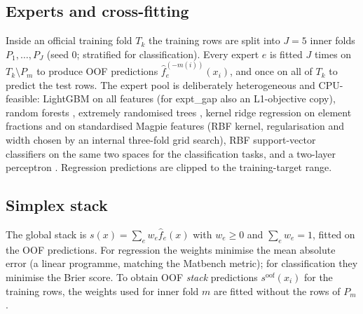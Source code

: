 \subsection{Experts and cross-fitting}
Inside an official training fold $T_k$ the training rows are split into $J=5$ inner folds $P_1,\dots,P_J$ (seed 0; stratified for classification).
Every expert $e$ is fitted $J$ times on $T_k\setminus P_m$ to produce OOF predictions $\hat f_e^{(-m(i))}(x_i)$, and once on all of $T_k$ to predict the test rows.
The expert pool is deliberately heterogeneous and CPU-feasible: LightGBM \citep{ke2017lightgbm} on all features (for expt\_gap also an L1-objective copy), random forests \citep{breiman2001rf}, extremely randomised trees \citep{geurts2006et}, kernel ridge regression on element fractions and on standardised Magpie features (RBF kernel, regularisation and width chosen by an internal three-fold grid search), RBF support-vector classifiers on the same two spaces for the classification tasks, and a two-layer perceptron \citep{pedregosa2011sklearn}.
Regression predictions are clipped to the training-target range.

\subsection{Simplex stack}
The global stack is $s(x)=\sum_e w_e \hat f_e(x)$ with $w_e\ge 0$ and $\sum_e w_e=1$, fitted on the OOF predictions.
For regression the weights minimise the mean absolute error (a linear programme, matching the Matbench metric); for classification they minimise the Brier score.
To obtain OOF \emph{stack} predictions $s^{\mathrm{oof}}(x_i)$ for the training rows, the weights used for inner fold $m$ are fitted without the rows of $P_m$.


